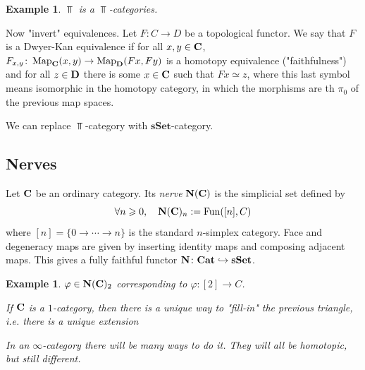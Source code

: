 \documentclass[A4paper, british, reqno]{amsart}
\theoremstyle{darkgreentheorem}
\theoremstyle{darkbluedefinition}
\theoremstyle{darkredexample}
\newtheorem{exa}[thm]{Example}
\theoremstyle{remark}
\DeclareMathOperator{\Sing}{Sing}
\DeclareMathOperator{\Fun}{Fun}
\DeclareMathOperator{\Map}{Map}
\DeclareMathOperator{\ho}{ho}
\newcommand{\sSet}{\mathbf{sSet}}
\newcommand{\1}{\mathbbm{1}}
\begin{document}
\begin{exa}
    $\Top$ is a $\Top$-categories.
\end{exa}

Now "invert" equivalences.
Let $F\colon C\to D$ be a topological functor.
We say that $F$ is a Dwyer-Kan equivalence if for all $x,y\in \mathbf{C}$, $F_{x,y}\colon \Map_{\bfC}(x,y)\to \Map_{\D}(Fx,Fy)$ is a homotopy equivalence ("faithfulness") and for all $z\in \mathbf{D}$ there is some $x\in \mathbf{C}$ such that $Fx\simeq z$, where this last symbol means isomorphic in the homotopy category, in which the morphisms are th $\pi_{0}$ of the previous map spaces.

\begin{center}
\end{center}

We can replace $\Top$-category with $\sSet$-category.

\subsection{Nerves}

Let $\mathbf{C}$ be an ordinary category.
Its \textit{nerve} $\mathbf{N}(\mathbf{C})$ is the simplicial set defined by
\[ \forall n\geqslant 0, \quad \bfN(\bfC)_{n}:=\Fun([n],C) \]
where $[n]=\{0\to \cdots \to n\}$ is the standard $n$-simplex category.
Face and degeneracy maps are given by inserting identity maps and composing adjacent maps.
This gives a fully faithful functor $\bfN\colon \Cat\hookrightarrow \sSet$.

\begin{exa}
    $\varphi\in \mathbf{N}(\mathbf{C})_{2}$ corresponding to $\varphi \colon [2]\to C$.
    \begin{center}
    \end{center}
    If $\mathbf{C}$ is a $1$-category, then there is a unique way to "fill-in" the previous triangle, i.e. there is a unique extension
    \begin{center}
    \end{center}
    In an $\infty$-category there will be many ways to do it.
    They will all be homotopic, but still different.
\end{exa}
\end{document}

